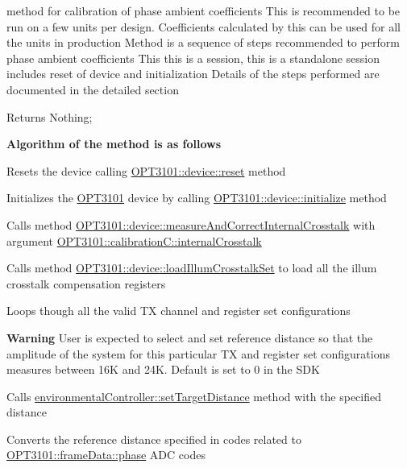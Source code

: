 method for calibration of phase ambient coefficients This is recommended to be run on a few units per design. Coefficients calculated by this can be used for all the units in production Method is a sequence of steps recommended to perform phase ambient coefficients This this is a session, this is a standalone session includes reset of device and initialization Details of the steps performed are documented in the detailed section 

\begin{DoxyReturn}{Returns}
Nothing; 
\end{DoxyReturn}
{\bfseries Algorithm of the method is as follows}


\begin{DoxyItemize}
\item Resets the device calling \mbox{\hyperlink{class_o_p_t3101_1_1device_a1d37b22f535d8130c7f24799f7fa3c33}{O\+P\+T3101\+::device\+::reset}} method
\item Initializes the \mbox{\hyperlink{namespace_o_p_t3101}{O\+P\+T3101}} device by calling \mbox{\hyperlink{class_o_p_t3101_1_1device_ae3b7fb4f9a8f1dee330523e034aa9460}{O\+P\+T3101\+::device\+::initialize}} method
\item Calls method \mbox{\hyperlink{class_o_p_t3101_1_1device_a44f832d6edbfb26db079ddba4debfdba}{O\+P\+T3101\+::device\+::measure\+And\+Correct\+Internal\+Crosstalk}} with argument \mbox{\hyperlink{class_o_p_t3101_1_1calibration_c_a4df5b876541e9b33eadf6290fe08b7e5}{O\+P\+T3101\+::calibration\+C\+::internal\+Crosstalk}}
\item Calls method \mbox{\hyperlink{class_o_p_t3101_1_1device_a48b320dfe4376bf62043d10ba937e8cd}{O\+P\+T3101\+::device\+::load\+Illum\+Crosstalk\+Set}} to load all the illum crosstalk compensation registers
\item Loops though all the valid TX channel and register set configurations
\item {\bfseries Warning} User is expected to select and set reference distance so that the amplitude of the system for this particular TX and register set configurations measures between 16K and 24K. Default is set to 0 in the S\+DK
\item Calls \mbox{\hyperlink{classenvironmental_controller_a8251b7f25c6a6c5583c718bac664d05b}{environmental\+Controller\+::set\+Target\+Distance}} method with the specified distance
\item Converts the reference distance specified in codes related to \mbox{\hyperlink{class_o_p_t3101_1_1frame_data_af8661d11405953dc378ad4d7cb0f2db6}{O\+P\+T3101\+::frame\+Data\+::phase}} A\+DC codes

\end{DoxyItemize}

